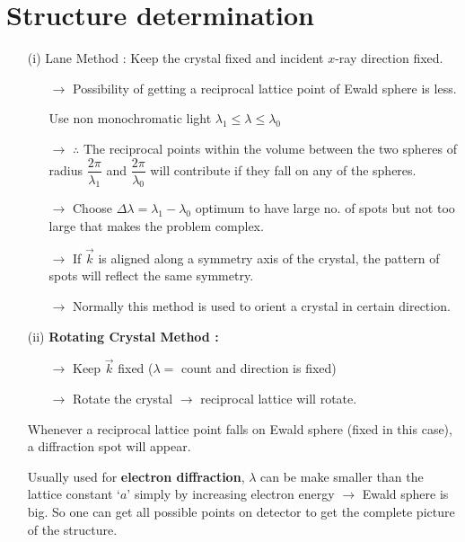 \section*{Structure determination}
\begin{itemize}
\item[(i)] Lane Method : Keep the crystal fixed and incident $x$-ray direction fixed.
\begin{itemize}
\item[$\to$] Possibility of getting a reciprocal lattice point of Ewald sphere is less.

Use non monochromatic light $\lambda_{1}\leq \lambda \leq \lambda_{0}$

\item[$\to$] $\therefore$ The reciprocal points within the volume between the two spheres of radius $\dfrac{2\pi}{\lambda_{1}}$ and $\dfrac{2\pi}{\lambda_{0}}$ will contribute if they fall on any of the spheres.

\item[$\to$] Choose $\Delta \lambda=\lambda_{1}-\lambda_{0}$ optimum to have large no. of spots but not too large that makes the problem complex.

\item[$\to$] If $\overrightarrow{k}$ is aligned along a symmetry axis of the crystal, the pattern of spots will reflect the same symmetry.

\item[$\to$] Normally this method is used to orient a crystal in certain direction.
\end{itemize}

\item[(ii)] {\bf Rotating Crystal Method :}
\begin{itemize}
\item[$\to$] Keep $\overrightarrow{k}$ fixed ($\lambda=$ count and direction is fixed)

\item[$\to$] Rotate the crystal $\to$ reciprocal lattice will rotate.
\end{itemize}
Whenever a reciprocal lattice point falls on Ewald sphere (fixed in this case), a diffraction spot will appear.

Usually used for {\bf electron diffraction}, $\lambda$ can be make smaller than the lattice constant `$a$' simply by increasing electron energy $\to$ Ewald sphere is big. So one can get all possible points on detector to get the complete picture of the structure.


\end{itemize}
